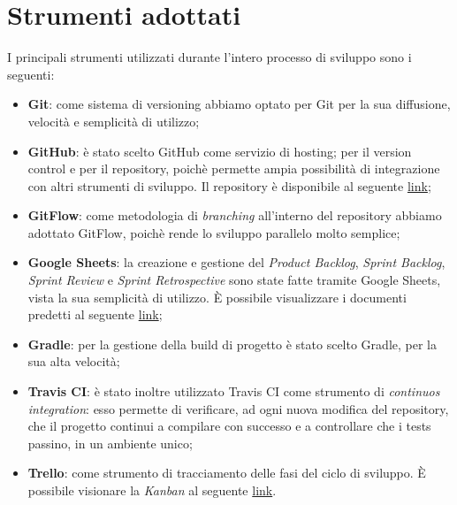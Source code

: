 \section{Strumenti adottati}
I principali strumenti utilizzati durante l'intero processo di sviluppo sono i seguenti:
\begin{itemize}
\item \textbf{Git}: come sistema di versioning abbiamo optato per Git per la sua diffusione, velocità e semplicità di utilizzo;
\item \textbf{GitHub}: è stato scelto GitHub come servizio di hosting;
per il version control e per il repository, poichè permette ampia possibilità di integrazione con altri strumenti di sviluppo. Il repository è disponibile al seguente \href{https://github.com/GMPVTeam/pps17-distributed-chat-service}{link};
\item \textbf{GitFlow}: come metodologia di \textit{branching} all’interno del repository abbiamo adottato
GitFlow, poichè rende lo sviluppo parallelo molto semplice;
\item \textbf{Google Sheets}: la creazione e gestione del \textit{Product Backlog}, \textit{Sprint Backlog}, \textit{Sprint Review} e \textit{Sprint Retrospective} sono state fatte tramite Google Sheets, vista la sua semplicità di utilizzo. È possibile visualizzare i documenti predetti al seguente \href{https://docs.google.com/spreadsheets/d/13H6Xl3ZzywzSpik3gxQbl6CnDtzObbCIdqROZq82Zk4/edit?usp=sharing}{link};
\item \textbf{Gradle}: per la gestione della build di progetto è stato scelto Gradle, per la sua alta velocità;
\item \textbf{Travis CI}: è stato inoltre utilizzato Travis CI come strumento di \textit{continuos integration}: esso permette di verificare, ad ogni nuova modifica del repository, che il progetto continui a compilare con successo e a controllare che i tests passino, in un ambiente unico;
\item \textbf{Trello}: come strumento di tracciamento delle fasi del ciclo di sviluppo. È possibile visionare la \textit{Kanban} al seguente \href{https://trello.com/b/iTJXBZUX}{link}.
\end{itemize}
